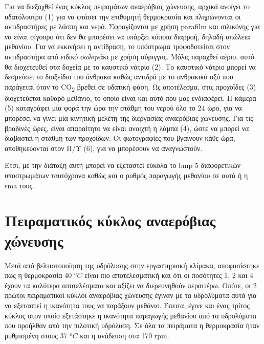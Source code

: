 \documentclass[11pt]{report}
\begin{document}
Για να διεξαχθεί ένας κύκλος πειραμάτων αναερόβιας χώνευσης, αρχικά ανοίγει το υδατόλουτρο (1) για να φτάσει την επιθυμητή θερμοκρασία και πληρώνονται οι αντιδραστήρες με λάσπη και νερό. Σφραγίζονται με χρήση parafilm και σιλικόνης για να είναι σίγουρο ότι δεν θα μπορέσει να υπάρξει κάποια διαρροή, δηλαδή απώλεια μεθανίου. Για να εκκινήσει η αντίδραση, το υπόστρωμα τροφοδοτείται στον αντιδραστήρα από ειδικό σωληνάκι με χρήση σύριγγας. Μόλις παραχθεί αέριο, αυτό θα διοχετευθεί στα δοχεία με το καυστικό νάτριο (2). Το καυστικό νάτριο μπορεί να δεσμεύσει το διοξείδιο του άνθρακα καθώς αντιδρά με το ανθρακικό οξύ που παράγεται όταν το CO\textsubscript{2} βρεθεί σε υδατική φάση. Ως αποτέλεσμα, στις προχοΐδες (3) διοχετεύεται καθαρό μεθάνιο, το οποίο είναι και αυτό που μας ενδιαφέρει. Η κάμερα (5) καταγράφει μία φορά την ώρα την στάθμη του νερού όλο το 24 ώρο, για να μπορέσει να γίνει μία κινητική μελέτη της διεργασίας αναερόβιας χώνευσης. Για τις βραδινές ώρες, είναι απαραίτητο να είναι ανοιχτή η λάμπα (4), ώστε να μπορεί να διαβαστεί η στάθμη των προχοΐδων. Οι φωτογραφίες που βγαίνουν κάθε ώρα, αποθηκεύονται στον Η/Υ (6), για να μπορέσουν να αναγνωστούν.

Έτσι, με την διάταξη αυτή μπορεί να εξεταστεί εύκολα το \acrfull{bmp} 5 διαφορετικών υποστρωμάτων ταυτόχρονα καθώς και ο ρυθμός παραγωγής μεθανίου σε αυτά ή η \acrfull{sma} τους. 

\section{Πειραματικός κύκλος αναερόβιας χώνευσης}
\label{sec:orge34a15f}
\label{sec:exp-ad}

Μετά από βελτιστοποίηση της υδρόλυσης στην εργαστηριακή κλίμακα, αποφασίστηκε πως η θερμοκρασία 40 \(^oC\) είναι πιο αποτελεσματική και ότι οι ποσότητες 1, 2 και 4 έχουν τα καλύτερα αποτελέσματα και αξίζει να διερευνηθούν περαιτέρω. Οπότε, οι 2 πρώτοι πειραματικοί κύκλοι αναερόβιας χώνευσης έγιναν με τα υδρολύματα αυτά για να εξεταστεί η ικανότητα τους να παράξουν μεθάνιο. Έπειτα, έγινε και ένας τρίτος κύκλος στον οποίο εξετάστηκε η ικανότητα παραγωγής μεθανίου από τα υδρολύματα που προήλθαν από την πιλοτική υδρόλυση. Σε όλα τα πειράματα η θερμοκρασία ήταν ρυθμισμένη στους 37 \(^oC\) και η ανάδευση στα 170 rpm.
\end{document}
